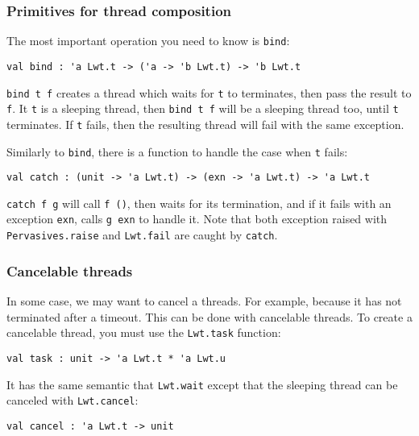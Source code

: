 \documentclass{article}
\begin{document}
\subsubsection{Primitives for thread composition}

The most important operation you need to know is \texttt{bind}:

\begin{verbatim}
val bind : 'a Lwt.t -> ('a -> 'b Lwt.t) -> 'b Lwt.t
\end{verbatim}

\texttt{bind t f} creates a thread which waits for \texttt{t} to
terminates, then pass the result to \texttt{f}. It \texttt{t} is a
sleeping thread, then \texttt{bind t f} will be a sleeping thread too,
until \texttt{t} terminates. If \texttt{t} fails, then the resulting
thread will fail with the same exception.

Similarly to \texttt{bind}, there is a function to handle the case
when \texttt{t} fails:

\begin{verbatim}
val catch : (unit -> 'a Lwt.t) -> (exn -> 'a Lwt.t) -> 'a Lwt.t
\end{verbatim}

\texttt{catch f g} will call \texttt{f ()}, then waits for its
termination, and if it fails with an exception \texttt{exn}, calls
\texttt{g exn} to handle it. Note that both exception raised with
\texttt{Pervasives.raise} and \texttt{Lwt.fail} are caught by
\texttt{catch}.

\subsubsection{Cancelable threads}

In some case, we may want to cancel a threads. For example, because it
has not terminated after a timeout. This can be done with cancelable
threads. To create a cancelable thread, you must use the
\texttt{Lwt.task} function:

\begin{verbatim}
val task : unit -> 'a Lwt.t * 'a Lwt.u
\end{verbatim}

It has the same semantic that \texttt{Lwt.wait} except that the
sleeping thread can be canceled with \texttt{Lwt.cancel}:

\begin{verbatim}
val cancel : 'a Lwt.t -> unit
\end{verbatim}
\end{document}

